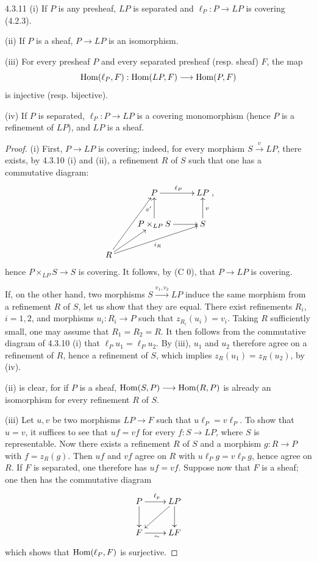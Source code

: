 \begin{proposition}{4.3.11}\label{IV.4.3.11}
(i) If \(P\) is any presheaf, \(LP\) is separated and
\(\ell_P:P\to LP\) is covering (4.2.3).

(ii) If \(P\) is a sheaf, \(P\to LP\) is an isomorphism.

(iii) For every presheaf \(P\) and every separated presheaf
(resp. sheaf) \(F\), the map
\[
\operatorname{Hom}(\ell_P,F):\operatorname{Hom}(LP,F)\longrightarrow\operatorname{Hom}(P,F)
\]
is injective (resp. bijective).

(iv) If \(P\) is separated, \(\ell_P:P\to LP\) is a covering
monomorphism (hence \(P\) is a refinement of \(LP\)), and \(LP\)
is a sheaf.
\end{proposition}
\begin{proof}
(i) First, \(P\to LP\) is covering; indeed, for every morphism
\(S\xrightarrow{v}LP\), there exists, by 4.3.10 (i) and (ii), a
refinement \(R\) of \(S\) such that one has a commutative diagram:
\[
\xymatrix@R=2.3em{
 & P\ar[r]^{\ell_P} & LP\\
 & P\times_{LP}S\ar[u]^{v'}\ar[r] & S\ar[u]_v\\
R\ar[uur]\ar[ur]\ar[urr]_{i_R} & & },
\]
hence \(P\times_{LP}S\to S\) is covering. It follows, by (C 0),
that \(P\to LP\) is covering.

If, on the other hand, two morphisms \(S\xrightarrow{v_1,v_2}LP\)
induce the same morphism from a refinement \(R\) of \(S\), let us show
that they are equal. There exist refinements \(R_i\), \(i=1,2\), and
morphisms \(u_i:R_i\to P\) such that \(z_{R_i}(u_i)=v_i\).
Taking \(R\) sufficiently small, one may assume that \(R_1=R_2=R\).
It then follows from the commutative diagram of 4.3.10 (i) that
\(\ell_Pu_1=\ell_Pu_2\). By \loccit{} (iii), \(u_1\) and \(u_2\)
therefore agree on a refinement of \(R\), hence a refinement of \(S\),
which implies \(z_R(u_1)=z_R(u_2)\), by \loccit{} (iv).

(ii) is clear, for if \(P\) is a sheaf,
\(\operatorname{Hom}(S,P)\longrightarrow\operatorname{Hom}(R,P)\) is already an isomorphism for every
refinement \(R\) of \(S\).

(iii) Let \(u,v\) be two morphisms \(LP\to F\) such that
\(u\ell_P=v\ell_P\). To show that \(u=v\), it suffices to see that
\(uf=vf\) for every \(f:S\to LP\), where \(S\) is representable.
Now there exists a refinement \(R\) of \(S\) and a morphism
\(g:R\to P\) with \(f=z_R(g)\). Then \(uf\) and \(vf\) agree on \(R\)
with \(u\ell_Pg=v\ell_Pg\), hence agree on \(R\).
If \(F\) is separated, one therefore has \(uf=vf\).
Suppose now that \(F\) is a sheaf; one then has the commutative diagram
\[
\xymatrix{
P\ar[r]^{\ell_p}\ar[d] & LP\ar[d]\ar[dl]\\
F\ar[r]_{\sim} & LF }
\]
which shows that \(\operatorname{Hom}(\ell_P,F)\) is surjective.


\end{proof}

